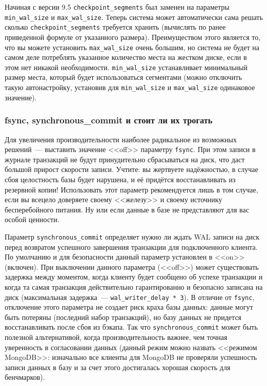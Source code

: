 Начиная с версии 9.5 \lstinline!checkpoint_segments! был заменен на параметры \lstinline!min_wal_size! и \lstinline!max_wal_size!. Теперь система может автоматически сама решать сколько \lstinline!checkpoint_segments! требуется хранить (вычислять по ранее приведенной формуле от указанного размера). Преимуществом этого является то, что вы можете установить \lstinline!max_wal_size! очень большим, но система не будет на самом деле потреблять указанное количество места на жестком диске, если в этом нет никакой необходимости. \lstinline!min_wal_size! устанавливает минимальный размер места, который будет использоваться сегментами (можно отключить такую автонастройку, установив для \lstinline!min_wal_size! и \lstinline!max_wal_size! одинаковое значение).


\subsubsection{fsync, synchronous\_commit и стоит ли их трогать}


Для увеличения производительности наиболее радикальное из возможных решений~--- выставить значение <<off>> параметру \lstinline!fsync!. При этом записи в журнале транзакций не будут принудительно сбрасываться на диск, что даст большой прирост скорости записи. Учтите: вы жертвуете надёжностью, в случае сбоя целостность базы будет нарушена, и её придётся восстанавливать из резервной копии! Использовать этот параметр рекомендуется лишь в том случае, если вы всецело доверяете своему <<железу>> и своему источнику бесперебойного питания. Ну или если данные в базе не представляют для вас особой ценности.

Параметр \lstinline!synchronous_commit! определяет нужно ли ждать WAL записи на диск перед возвратом успешного завершения транзакции для подключенного клиента. По умолчанию и для безопасности данный параметр установлен в <<on>> (включен). При выключении данного параметра (<<off>>) может существовать задержка между моментом, когда клиенту будет сообщено об успехе транзакции и когда та самая транзакция действительно гарантированно и безопасно записана на диск (максимальная задержка~--- \lstinline!wal_writer_delay * 3!). В отличие от \lstinline!fsync!, отключение этого параметра не создает риск краха базы данных: данные могут быть потеряны (последний набор транзакций), но базу данных не придется восстанавливать после сбоя из бэкапа. Так что \lstinline!synchronous_commit! может быть полезной альтернативой, когда производительность важнее, чем точная уверенность в согласовании данных (данный режим можно назвать <<режимом MongoDB>>: изначально все клиенты для MongoDB не проверяли успешность записи данных в базу и за счет этого достигалась хорошая скорость для бенчмарков).


